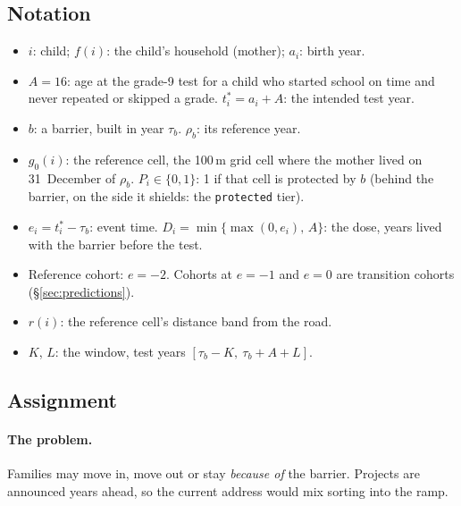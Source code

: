 \documentclass[11pt]{article}
\begin{document}
\subsection{Notation}

\begin{itemize}
\item \(i\): child; \(f(i)\): the child's household (mother); \(a_i\): birth year.
\item \(A = 16\): age at the grade-9 test for a child who started school on time and never
  repeated or skipped a grade. \(t^*_i = a_i + A\): the intended test year.
\item \(b\): a barrier, built in year \(\tau_b\). \(\rho_b\): its reference year.
\item \(g_0(i)\): the reference cell, the 100\,m grid cell where the mother lived on
  31~December of \(\rho_b\). \(P_i \in \{0,1\}\): 1 if that cell is protected by \(b\) (behind
  the barrier, on the side it shields: the \texttt{protected} tier).
\item \(e_i = t^*_i - \tau_b\): event time. \(D_i = \min\{\max(0, e_i),\, A\}\): the dose,
  years lived with the barrier before the test.
\item Reference cohort: \(e = -2\). Cohorts at \(e = -1\) and \(e = 0\) are transition cohorts
  (\S\ref{sec:predictions}).
\item \(r(i)\): the reference cell's distance band from the road.
\item \(K\), \(L\): the window, test years \([\tau_b - K,\ \tau_b + A + L]\).
\end{itemize}

\subsection{Assignment}\label{sec:assignment}

\paragraph{The problem.} Families may move in, move out or stay \emph{because of} the barrier.
Projects are announced years ahead, so the current address would mix sorting into the ramp.
\end{document}
